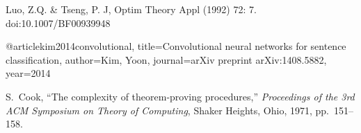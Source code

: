 
\begin{thereferences}{99}

Luo, Z.Q. \& Tseng, P. J,
Optim Theory Appl (1992) 72: 7. doi:10.1007/BF00939948

@article{kim2014convolutional,
  title={Convolutional neural networks for sentence classification},
  author={Kim, Yoon},
  journal={arXiv preprint arXiv:1408.5882},
  year={2014}
}


S.~Cook,
 ``The complexity of theorem-proving procedures,''
 {\it Proceedings of the 3rd ACM Symposium on Theory of Computing},
 Shaker Heights, Ohio, 1971, pp.~151--158.
\end{thereferences}
